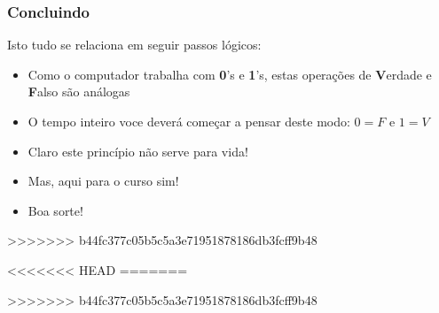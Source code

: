 \documentclass{beamer}
\begin{document}
\begin{frame}
\frametitle{Concluindo}


\begin{block}{Isto tudo se relaciona em seguir passos lógicos: }

\begin{itemize}

  \item Como o computador trabalha com \textbf{0}'s e \textbf{1}'s, estas operações de \textbf{V}erdade e \textbf{F}also são análogas
  \pause
    \item O tempo inteiro voce deverá começar a pensar deste modo: $0 = F$ e $1 = V$
      \pause
    \item Claro este princípio não serve para vida!
      \pause
    \item Mas, aqui para o curso sim!
      \pause
    \item Boa sorte!

\end{itemize}

  \end{block}

>>>>>>> b44fc377c05b5c5a3e71951878186db3fcff9b48

\end{frame}



<<<<<<< HEAD
=======








>>>>>>> b44fc377c05b5c5a3e71951878186db3fcff9b48
\end{document}
